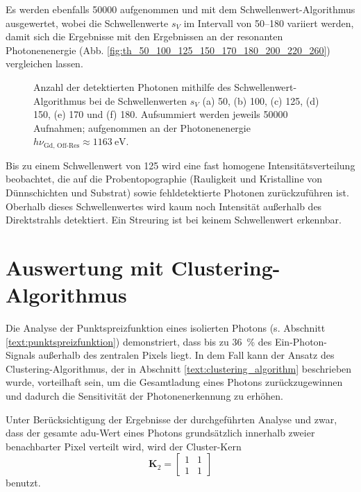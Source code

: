 \noindent
Es werden ebenfalls \SI{50000}{\captures} aufgenommen und mit dem Schwellenwert-Algorithmus ausgewertet, wobei die Schwellenwerte $s_V$ im Intervall von \SIrange{50}{180}{\adu} variiert werden, damit sich die Ergebnisse mit den Ergebnissen an der resonanten Photonenenergie (Abb. \ref{fig:th_50_100_125_150_170_180_200_220_260}) vergleichen lassen.
\begin{figure}[H]
    \centering
    
    \caption{Anzahl der detektierten Photonen mithilfe des Schwellenwert-Algorithmus bei de Schwellenwerten $s_V$ (a) \SI{50}{\adu}, (b) \SI{100}{\adu}, (c) \SI{125}{\adu}, (d) \SI{150}{\adu}, (e) \SI{170}{\adu} und (f) \SI{180}{\adu}. Aufsummiert werden jeweils \num{50000} Aufnahmen; aufgenommen an der Photonenenergie $h\nu_\text{Gd, Off-Res} \approx \SI{1163}{\eV}$.}
    \label{fig:th_50_100_125_150_170_180_off_resonance}
\end{figure}
\noindent
Bis zu einem Schwellenwert von \SI{125}{\adu} wird eine fast homogene Intensitätsverteilung beobachtet, die auf die Probentopographie (Rauligkeit und Kristalline von Dünnschichten und Substrat) sowie fehldetektierte Photonen zurückzuführen ist. Oberhalb dieses Schwellenwertes wird kaum noch Intensität außerhalb des Direktstrahls detektiert. Ein Streuring ist bei keinem Schwellenwert erkennbar.

\section{Auswertung mit Clustering-Algorithmus}
Die Analyse der Punktspreizfunktion eines isolierten Photons (s. Abschnitt \ref{text:punktspreizfunktion}) demonstriert, dass bis zu \SI{36}{\percent} des Ein-Photon-Signals außerhalb des zentralen Pixels liegt. In dem Fall kann der Ansatz des Clustering-Algorithmus, der in Abschnitt \ref{text:clustering_algorithm} beschrieben wurde, vorteilhaft sein, um die Gesamtladung eines Photons zurückzugewinnen und dadurch die Sensitivität der Photonenerkennung zu erhöhen.

\noindent
Unter Berücksichtigung der Ergebnisse der durchgeführten Analyse und zwar, dass der gesamte \gls{adu}-Wert eines Photons grundsätzlich innerhalb zweier benachbarter Pixel verteilt wird, wird der Cluster-Kern
\begin{equation}
    \mathbf{K}_2 = \begin{bmatrix}
1 & 1\\
1 & 1
\end{bmatrix}
\end{equation}
benutzt.

